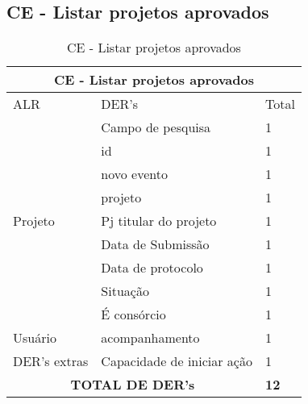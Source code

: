   \subsection{CE - Listar projetos aprovados}
\begin{table}[!h]
\centering
\caption{CE - Listar projetos aprovados}
\label{ce_listar_projetos_aprovados}
\begin{tabular}{|l|l|l|}
\multicolumn{3}{c}{CE - Listar projetos aprovados}                   \\\hline
ALR                      & DER's                      & Total         \\\hline
\multirow{9}{*}{Projeto} & Campo de pesquisa          & 1             \\ \cline{2-3}
                         & id                         & 1             \\ \cline{2-3}
                         & novo evento                & 1             \\\cline{2-3}
                         & projeto                    & 1             \\\cline{2-3}
                         & Pj titular do projeto      & 1             \\\cline{2-3}
                         & Data de Submissão          & 1             \\\cline{2-3}
                         & Data de protocolo          & 1             \\\cline{2-3}
                         & Situação                   & 1             \\\cline{2-3}
                         & É consórcio                & 1             \\\hline
Usuário                  & acompanhamento             & 1             \\\hline
DER's extras             & Capacidade de iniciar ação & 1             \\\hline
\multicolumn{2}{|c|}{\textbf{TOTAL DE DER's}}                   & \textbf{12}  \\ \hline
\end{tabular}
\end{table}

